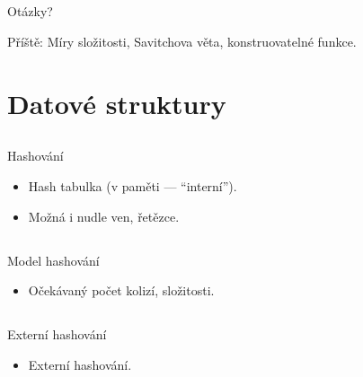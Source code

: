 \documentclass{beamer}
\begin{document}
\subsection{}
\begin{frame}{Otázky?}
\begin{center}
Příště: Míry složitosti, Savitchova věta, konstruovatelné funkce.
\end{center}
\end{frame}

\section{Datové struktury}

\subsection{}
\begin{frame}{Hashování}
\begin{itemize}
\item Hash tabulka (v paměti --- ``interní'').
\item Možná i nudle ven, řetězce.
\end{itemize}
\end{frame}

\subsection{}
\begin{frame}{Model hashování}
\begin{itemize}
\item Očekávaný počet kolizí, složitosti.
\end{itemize}
\end{frame}

\subsection{}
\begin{frame}{Externí hashování}
\begin{itemize}
\item Externí hashování.
\end{itemize}
\end{frame}

\subsection{}
\end{document}
